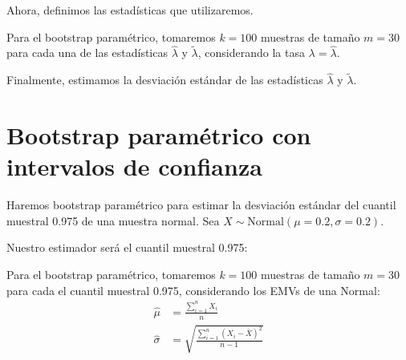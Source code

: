 \documentclass[10pt]{article}\usepackage[]{graphicx}\usepackage[]{xcolor}
\begin{document}
Ahora, definimos las estadísticas que utilizaremos.

Para el bootstrap paramétrico, tomaremos $k=100$ muestras de tamaño $m=30$ para cada una de las estadísticas $\hat{\lambda}$ y $\tilde{\lambda}$, considerando la tasa $\lambda=\hat{\lambda}$.

Finalmente, estimamos la desviación estándar de las estadísticas $\hat{\lambda}$ y $\tilde{\lambda}$.


\section{Bootstrap paramétrico con intervalos de confianza}
Haremos bootstrap paramétrico para estimar la desviación estándar del cuantil muestral 0.975 de una muestra normal. Sea $X\sim \mathrm{Normal}(\mu = 0.2, \sigma = 0.2)$.

Nuestro estimador será el cuantil muestral 0.975:


Para el bootstrap paramétrico, tomaremos $k=100$ muestras de tamaño $m=30$ para cada el cuantil muestral 0.975, considerando los EMVs de una Normal:
\begin{align*}
  \hat{\mu} &= \frac{\sum\limits_{i=1}^n X_i}{n}\\
  \hat{\sigma} &= \sqrt{\frac{\sum\limits_{i=1}^n \left(X_i - \bar{X} \right)^2}{n-1}}
\end{align*}
\end{document}
